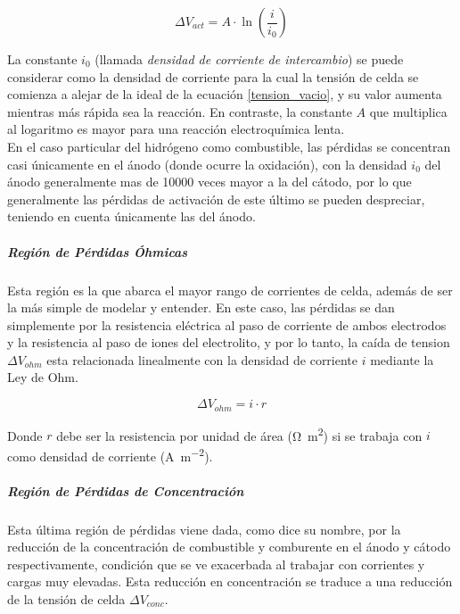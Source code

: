 \begin{equation}\label{perd_act}
    \Delta V_{act}=A\cdot \ln\left(\frac{i}{i_0}\right)
\end{equation}

La constante $i_0$ (llamada \textit{densidad de corriente de intercambio}) se puede considerar como la densidad de corriente para la cual la tensión de celda se comienza a alejar de la ideal de la ecuación \ref{tension_vacio}, y su valor aumenta mientras más rápida sea la reacción. En contraste, la constante $A$ que multiplica al logaritmo es mayor para una reacción electroquímica lenta.\\

En el caso particular del hidrógeno como combustible, las pérdidas se concentran casi únicamente en el ánodo (donde ocurre la oxidación), con la densidad $i_0$ del ánodo generalmente mas de \num{10000} veces mayor a la del cátodo, por lo que generalmente las pérdidas de activación de este último se pueden despreciar, teniendo en cuenta únicamente las del ánodo.\\

\subparagraph{Región de Pérdidas Óhmicas}

Esta región es la que abarca el mayor rango de corrientes de celda, además de ser la más simple de modelar y entender. En este caso, las pérdidas se dan simplemente por la resistencia eléctrica al paso de corriente de ambos electrodos y la resistencia al paso de iones del electrolito, y por lo tanto, la caída de tension $\Delta V_{ohm}$ esta relacionada linealmente con la densidad de corriente $i$ mediante la Ley de Ohm.

\begin{equation}\label{perd_ohm}
    \Delta V_{ohm}=i\cdot r
\end{equation}

Donde $r$ debe ser la resistencia por unidad de área (\unit{\ohm\metre\squared}) si se trabaja con $i$ como densidad de corriente (\unit{\ampere\per\metre\squared}).\\

\subparagraph{Región de Pérdidas de Concentración}
    
Esta última región de pérdidas viene dada, como dice su nombre, por la reducción de la concentración de combustible y comburente en el ánodo y cátodo respectivamente, condición que se ve exacerbada al trabajar con corrientes y cargas muy elevadas. Esta reducción en concentración se traduce a una reducción de la tensión de celda $\Delta V_{conc}$.\\

